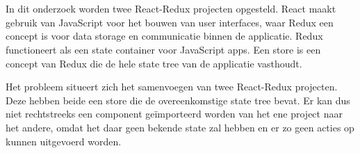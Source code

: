 
%
%

%



\chapter*{}

In dit onderzoek worden twee React-Redux projecten opgesteld. React maakt gebruik van JavaScript voor het bouwen van user interfaces, waar Redux een concept is voor data storage en communicatie binnen de applicatie. Redux functioneert als een state container voor JavaScript apps. Een store is een concept van Redux die de hele state tree van de applicatie vasthoudt.

Het probleem situeert zich het samenvoegen van twee React-Redux projecten. Deze hebben beide een store die de overeenkomstige state tree bevat. Er kan dus niet rechtstreeks een component geïmporteerd worden van het ene project naar het andere, omdat het daar geen bekende state zal hebben en er zo geen acties op kunnen uitgevoerd worden.

